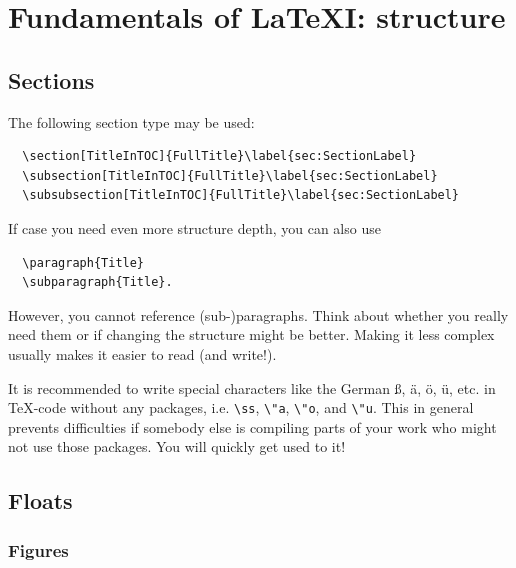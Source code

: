 \documentclass[../main.tex]{subfiles}
\begin{document}
\section{Fundamentals of \LaTeX I: structure}
\label{sec:struct}

\subsection{Sections}
\label{sec:sec}
The following section type may be used:

\begin{verbatim}
  \section[TitleInTOC]{FullTitle}\label{sec:SectionLabel}
  \subsection[TitleInTOC]{FullTitle}\label{sec:SectionLabel}
  \subsubsection[TitleInTOC]{FullTitle}\label{sec:SectionLabel}
\end{verbatim}
If case you need even more structure depth, you can also use

\begin{verbatim}
  \paragraph{Title}
  \subparagraph{Title}.
\end{verbatim}
However, you cannot reference (sub-)paragraphs. Think about whether you really
need them or if changing the structure might be better. Making it less complex
usually makes it easier to read (and write!).

It is recommended to write special characters like the German \ss, \"a,
\"o, \"u, etc. in \TeX-code without any packages, i.e. \verb!\ss!, \verb!\"a!,
\verb!\"o!, and \verb!\"u!. This in general prevents difficulties if somebody
else is compiling parts of your work who might not use those packages. You
will quickly get used to it!

\subsection{Floats}
\label{sec:float}


\subsubsection{Figures}
\label{sec:fig}
\end{document}
